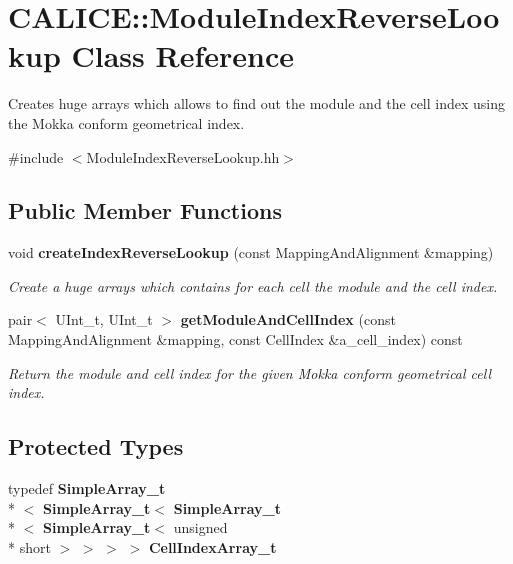 \section{C\-A\-L\-I\-C\-E\-:\-:Module\-Index\-Reverse\-Lookup Class Reference}
\label{classCALICE_1_1ModuleIndexReverseLookup}


Creates huge arrays which allows to find out the module and the cell index using the Mokka conform geometrical index.  




{\ttfamily \#include $<$Module\-Index\-Reverse\-Lookup.\-hh$>$}

\subsection*{Public Member Functions}
\begin{DoxyCompactItemize}
\item 
void {\bf create\-Index\-Reverse\-Lookup} (const Mapping\-And\-Alignment \&mapping)
\begin{DoxyCompactList}\small\item\em Create a huge arrays which contains for each cell the module and the cell index. \end{DoxyCompactList}\item 
pair$<$ U\-Int\-\_\-t, U\-Int\-\_\-t $>$ {\bf get\-Module\-And\-Cell\-Index} (const Mapping\-And\-Alignment \&mapping, const Cell\-Index \&a\-\_\-cell\-\_\-index) const 
\begin{DoxyCompactList}\small\item\em Return the module and cell index for the given Mokka conform geometrical cell index. \end{DoxyCompactList}\end{DoxyCompactItemize}
\subsection*{Protected Types}
\begin{DoxyCompactItemize}
\item 
typedef {\bf Simple\-Array\-\_\-t}\\*
$<$ {\bf Simple\-Array\-\_\-t}$<$ {\bf Simple\-Array\-\_\-t}\\*
$<$ {\bf Simple\-Array\-\_\-t}$<$ unsigned \\*
short $>$ $>$ $>$ $>$ {\bfseries Cell\-Index\-Array\-\_\-t}\label{classCALICE_1_1ModuleIndexReverseLookup_a3cb8a61f3dc239ac5ffbee685bf6988f}

\end{DoxyCompactItemize}
